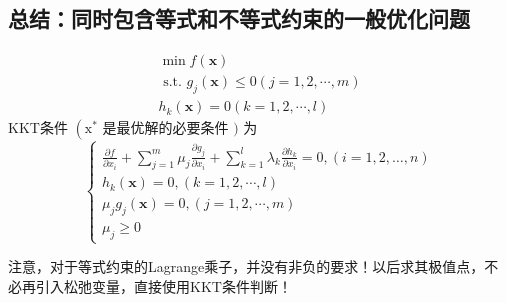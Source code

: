 \subsection{总结：同时包含等式和不等式约束的一般优化问题}

$$
\begin{array}{l}
\min f(\mathbf{x}) \\
\text { s.t. } g_{j}(\mathbf{x}) \leq 0(j=1,2, \cdots, m) \\
h_{k}(\mathbf{x})=0(k=1,2, \cdots, l)
\end{array}
$$
KKT条件 $ \left(\mathrm{x}^{*}\right. $ 是最优解的必要条件 $ ) $ 为
$$
\left\{\begin{array}{l}
\frac{\partial f}{\partial x_{i}}+\sum_{j=1}^{m} \mu_{j} \frac{\partial g_{j}}{\partial x_{i}}+\sum_{k=1}^{l} \lambda_{k} \frac{\partial h_{k}}{\partial x_{i}}=0,(i=1,2, \ldots, n) \\
h_{k}(\mathbf{x})=0,(k=1,2, \cdots, l) \\
\mu_{j} g_{j}(\mathbf{x})=0,(j=1,2, \cdots, m) \\
\mu_{j} \geq 0
\end{array}\right.
$$

注意，对于等式约束的Lagrange乘子，并没有非负的要求！以后求其极值点，不必再引入松弛变量，直接使用KKT条件判断！